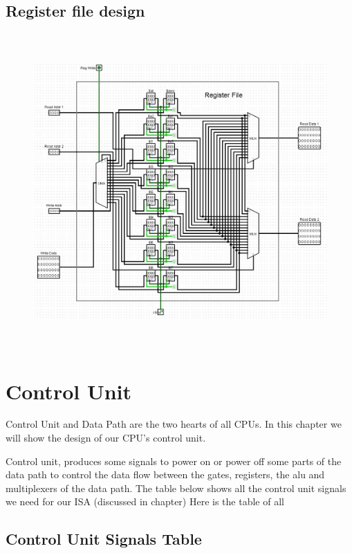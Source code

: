 \documentclass[12pt, dvipsnames, svgnames, x11names, oneside]{book}
\newenvironment{sansserif}{\sffamily}{\normalfont}
\begin{document}
\section{Register file design}\label{sec:regfile-pic}
\begin{figure}[H]
\begin{center}
\includegraphics[width=\textwidth, height=12cm]{./images/registerfile}
\end{center}
\end{figure}


\chapter{Control Unit}
\begin{sansserif}
Control Unit and Data Path are the two hearts of all CPUs. In this chapter we will show the design of our CPU's control unit.
\end{sansserif}

Control unit, produces some signals to power on or power off some parts of the data path to control the data flow between the gates, registers, the alu and multiplexers of the data path. The table below shows all the control unit signals we need for our ISA (discussed in  chapter)
Here is the table of all 

\section{Control Unit Signals Table}
\end{document}
